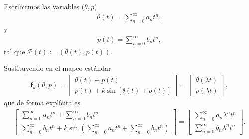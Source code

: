 \documentclass[11pt]{beamer}
\theoremstyle{definition}
\begin{document}
\begin{frame}
Escribirmos las variables ($\theta,p$) 
\begin{eqnarray}
\theta(t)=\sum_{n=0}^{\infty}a_{n}t^{n}  ,
\label{theta}
\end{eqnarray}
y
\begin{eqnarray}
p(t)=\sum_{n=0}^{\infty}b_{n}t^{n},
\label{p}
\end{eqnarray}
tal que $\mathcal{P}(t):=(\theta(t),p(t))$.
\end{frame}
\begin{frame}
Sustituyendo en el mapeo est\'andar
\begin{eqnarray}
\mathbf{f}_{k}(\theta,p) = \left[\begin{array}{c}
\theta(t) + p(t) \\
p(t) + k\sin[\theta(t) +p(t)]
\end{array}\right] =\left[ \begin{array}{c}
\theta(\lambda t) \\
p(\lambda t)
\end{array}\right], 
\label{sumas en mapeo}
\end{eqnarray}
que de forma expl\'icita es
\begin{eqnarray}
\left[\begin{array}{c}
\sum_{n=0}^{\infty}a_{n}t^{n} + \sum_{n=0}^{\infty}b_{n}t^{n} \\
\sum_{n=0}^{\infty}b_{n}t^{n} + k\sin(\sum_{n=0}^{\infty}a_{n}t^{n} + \sum_{n=0}^{\infty}b_{n}t^{n})
\end{array}\right] =\left[ \begin{array}{c}
\sum_{n=0}^{\infty}a_{n}\lambda^{n}t^{n} \\
\sum_{n=0}^{\infty}b_{n}\lambda^{n}t^{n}
\end{array}\right].
\label{expandida}
\end{eqnarray}

\end{frame}
\end{document}

